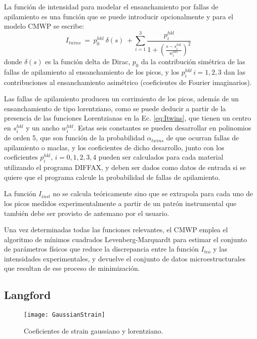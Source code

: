 La función de intensidad para modelar el ensanchamiento por fallas de apilamiento es una función que se puede introducir opcionalmente y para el modelo CMWP se escribe\cite{Ribarik2008}:
\begin{equation}
  I_{twins} \ = \ p_0^{hkl} \ \delta(s) \ + \sum_{i=1}^{3} \frac{p_{i}^{hkl}}{1+\left( \frac{s - s_i^{hkl}}{w_i^{hkl}} \right)^2}
  \label{eq:Itwins}
\end{equation}
\noindent
donde $\delta(s)$ es la función delta de Dirac, $p_0$ da la contribución simétrica de las fallas de apilamiento al ensanchamiento de los picos, y los $p_i^{hkl}\,i=1,2,3$ dan las contribuciones al ensanchamiento asimétrico (coeficientes de Fourier imaginarios).

Las fallas de apilamiento producen un corrimiento de los picos, además de un ensanchamiento de tipo lorentziano, como se puede deducir a partir de la presencia de las funciones Lorentzianas en la Ec. \ref{eq:Itwins}, que tienen un centro en $s_i^{hkl}$ y un ancho $w_i^{hkl}$.
Estas seis constantes se pueden desarrollar en polinomios de orden 5, que son función de la probabilidad $\alpha_{twins}$ de que ocurran fallas de apilamiento o maclas\cite{Ribarik2008}, y los coeficientes de dicho desarrollo, junto con los coeficientes $p_i^{hkl},\,i=0,1,2,3,4$ pueden ser calculados para cada material utilizando el programa DIFFAX\cite{Treacy1991}, y deben ser dados como datos de entrada si se quiere que el programa calcule la probabilidad de fallas de apilamiento.

La función $I_{inst}$ no se calcula teóricamente sino que se extrapola para cada uno de los picos medidos experimentalmente a partir de un patrón instrumental que también debe ser provisto de antemano por el usuario.

Una vez determinadas todas las funciones relevantes, el CMWP emplea el algoritmo de mínimos cuadrados Levenberg-Marquardt para estimar el conjunto de parámetros físicos que reduce la discrepancia entre la función $I_{teo}$ y las intensidades experimentales, y devuelve el conjunto de datos microestructurales que resultan de ese proceso de minimización.
\iffalse
\subsection{Langford}\label{SS:02Langford}

\begin{figure}[!htb]
  \centering
  \texttt{[image: GaussianStrain]}
  \caption{Coeficientes de strain gaussiano y lorentziano.}
  \label{fig:GaussStrainn}
\end{figure}


